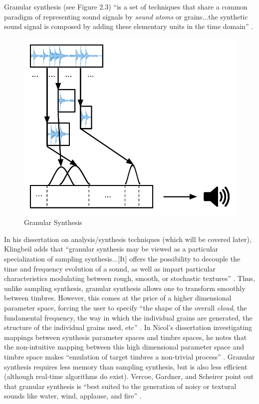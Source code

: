 \documentclass[12pt]{report} 	%
\numberwithin{figure}{chapter}
\numberwithin{table}{chapter}
\numberwithin{equation}{chapter}
\begin{document}
\begin{flushleft}
Granular synthesis (see Figure 2.3) ``is a set of techniques that share a common paradigm of representing sound signals by \textit{sound atoms} or grains...the synthetic sound signal is composed by adding these elementary units in the time domain'' \cite[p.13]{Tolonen:1998bh}. 
\begin{figure}[h!]
\begin{center}
\includegraphics[scale=0.8]{GranularSynthesis}
\caption[Granular synthesis]{Granular Synthesis}
\end{center}
\end{figure}
In his dissertation on analysis/synthesis techniques (which will be covered later), Klingbeil adds that ``granular synthesis may be viewed as a particular specialization of sampling synthesis...[It] offers the possibility to decouple the time and frequency evolution of a sound, as well as impart particular characteristics modulating between rough, smooth, or stochastic textures'' \cite[p. 6]{Klingbeil:2009lo}. Thus, unlike sampling synthesis, granular synthesis allows one to transform smoothly between timbres. However, this comes at the price of a higher dimensional parameter space, forcing the user to specify ``the shape of the overall \textit{cloud}, the fundamental frequency, the way in which the individual grains are generated, the structure of the individual grains used, etc'' \cite[p. 5]{Johnson:1998sh}. In Nicol's dissertation investigating mappings between synthesis parameter spaces and timbre spaces, he notes that the non-intuitive mapping between this high dimensional parameter space and timbre space makes ``emulation of target timbres a non-trivial process'' \cite[p. 49]{Nicol:2005rp}. Granular synthesis requires less memory than sampling synthesis, but is also less efficient (although real-time algorithms do exist). Vercoe, Gardner, and Scheirer point out that granular synthesis is ``best suited to the generation of noisy or textural sounds like water, wind, applause, and fire'' \cite[p. 6]{Vercoe:1998hh}.


\end{flushleft}
\end{document}
